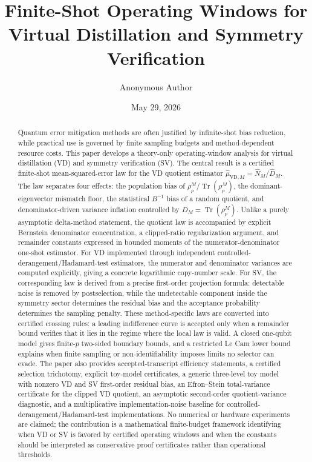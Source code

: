 \documentclass[11pt]{article}
\title{\bfseries Finite-Shot Operating Windows for\\ Virtual Distillation and Symmetry Verification}
\author{Anonymous Author}
\date{May 29, 2026}
\DeclareMathOperator{\Tr}{Tr}
\newcommand{\1}{\mathbf{1}}
\begin{document}
\maketitle


\begin{abstract}
Quantum error mitigation methods are often justified by infinite-shot bias reduction, while practical use is governed by finite sampling budgets and method-dependent resource costs.  This paper develops a theory-only operating-window analysis for virtual distillation (VD) and symmetry verification (SV).  The central result is a certified finite-shot mean-squared-error law for the VD quotient estimator \(\widehat\mu_{\mathrm{VD},M}=\widehat N_M/\widehat D_M\).  The law separates four effects: the population bias of \(\rho_p^M/\Tr(\rho_p^M)\), the dominant-eigenvector mismatch floor, the statistical \(B^{-1}\) bias of a random quotient, and denominator-driven variance inflation controlled by \(D_M=\Tr(\rho_p^M)\).  Unlike a purely asymptotic delta-method statement, the quotient law is accompanied by explicit Bernstein denominator concentration, a clipped-ratio regularization argument, and remainder constants expressed in bounded moments of the numerator-denominator one-shot estimator.  For VD implemented through independent controlled-derangement/Hadamard-test estimators, the numerator and denominator variances are computed explicitly, giving a concrete logarithmic copy-number scale.  For SV, the corresponding law is derived from a precise first-order projection formula: detectable noise is removed by postselection, while the undetectable component inside the symmetry sector determines the residual bias and the acceptance probability determines the sampling penalty.  These method-specific laws are converted into certified crossing rules: a leading indifference curve is accepted only when a remainder bound verifies that it lies in the regime where the local law is valid.  A closed one-qubit model gives finite-\(p\) two-sided boundary bounds, and a restricted Le Cam lower bound explains when finite sampling or non-identifiability imposes limits no selector can evade.  The paper also provides accepted-transcript efficiency statements, a certified selection trichotomy, explicit toy-model certificates, a generic three-level toy model with nonzero VD and SV first-order residual bias, an Efron--Stein total-variance certificate for the clipped VD quotient, an asymptotic second-order quotient-variance diagnostic, and a multiplicative implementation-noise baseline for controlled-derangement/Hadamard-test implementations.  No numerical or hardware experiments are claimed; the contribution is a mathematical finite-budget framework identifying when VD or SV is favored by certified operating windows and when the constants should be interpreted as conservative proof certificates rather than operational thresholds.
\end{abstract}
\end{document}
